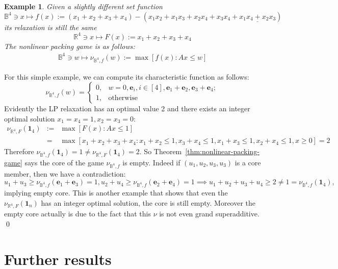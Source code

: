 \documentclass[11pt]{article}\usepackage[]{graphicx}\usepackage[]{xcolor}
\newtheorem{example}{Example}
\begin{document}
\begin{example} Given a slightly different set function
\[
\mathbb{B}^4\ni x\mapsto f(x):=(x_1+x_2+x_3+x_4)-(x_1x_2+x_1x_3+x_2x_4+x_3x_4+\underline{x_1x_4+x_2x_3})
\]
its relaxation is still the same
\[
\mathbb{R}^4\ni x\mapsto F(x):=x_1+x_2+x_3+x_4
\]
The nonlinear packing game is as follows:
\begin{eqnarray*}
\mathbb{B}^4\ni w\mapsto \nu_{\mathbb{B}^4,f}(w):=\max [f(x): Ax\le w]
\end{eqnarray*}
\end{example}

For this simple example, we can compute its characteristic function as follows:
\[
\nu_{\mathbb{B}^4,f}(w)=
\begin{cases}
0, &w=0, \mathbf{e}_i, i\in [4], \mathbf{e}_1+\mathbf{e}_2, \mathbf{e}_3+\mathbf{e}_4;\\
1,  & \text{otherwise}
\end{cases}
\]
Evidently the LP relaxation has an optimal value 2 and there exists an integer optimal solution $x_1=x_4=1, x_2=x_3=0$:
\begin{eqnarray*}
\nu_{\mathbb{R}^4,F}\left(\mathbf{1}_4\right)&:=&\max [F(x): Ax\le 1]\\
&=&\max[x_1+x_2+x_3+x_4: x_1+x_2\le 1, x_3+x_4\le 1, x_1+x_3\le 1,  x_2+x_4\le 1, x\ge 0]=2
\end{eqnarray*}
Therefore $\nu_{\mathbb{B}^4,f}\left(\mathbf{1}_4\right)=1\ne \nu_{\mathbb{R}^4,F}\left(\mathbf{1}_4\right)=2$. So Theorem~\ref{thm:nonlinear-packing-game} says the core of the game $\nu_{\mathbb{B}^4,f}$ is empty. Indeed if $(u_1,u_2,u_3,u_3)$ is a core member, then we have a contradiction:
\[
u_1+u_3\ge \nu_{\mathbb{B}^4,f}(\mathbf{e}_1+\mathbf{e}_3)=1, u_2+u_4\ge \nu_{\mathbb{B}^4,f}(\mathbf{e}_2+\mathbf{e}_4)=1\implies u_1+u_2+u_3+u_4\ge 2\ne 1=\nu_{\mathbb{B}^4,f}\left(\mathbf{1}_4\right),
\]
implying empty core. This is another example that shows that even the $\nu_{\mathbb{R}^4,F}\left(\mathbf{1}_n\right)$ has an integer optimal solution, the core is still empty. Moreover the empty core actually is due to the fact that this $\nu$ is not even grand superadditive. \qed

\section{Further results}\label{sec:further-results}
\end{document}
